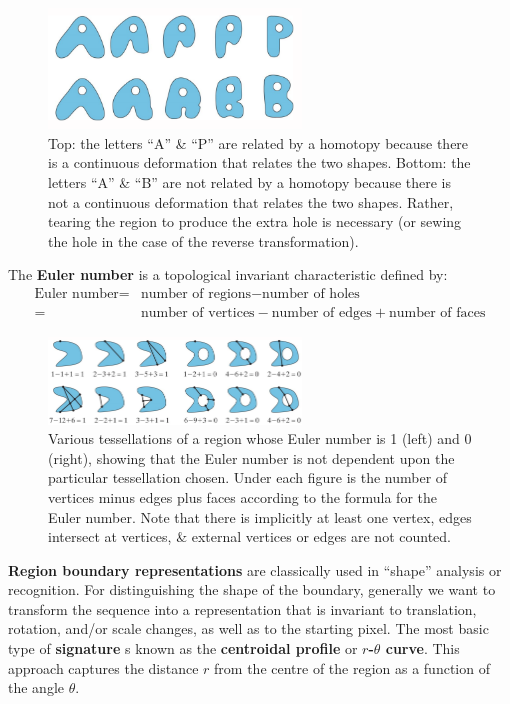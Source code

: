 \documentclass[a4paper,11pt]{article}
\begin{document}
\begin{figure}[H]
    \centering
    \includegraphics[width=0.6\textwidth]{images/homotopy.png}
    \caption{
        Top: the letters ``A'' \& ``P'' are related by a homotopy because there is a continuous deformation that relates the two shapes.
        Bottom: the letters ``A'' \& ``B'' are not related by a homotopy because there is not a continuous deformation that relates the two shapes.
        Rather, tearing the region to produce the extra hole is necessary (or sewing the hole in the case of the reverse transformation).
    }
\end{figure}

The \textbf{Euler number} is a topological invariant characteristic defined by:
\begin{align*}
    \text{Euler number} =& \text{number of regions} - \text{number of holes} \\
                        =& \text{number of vertices} - \text{number of edges} + \text{number of faces}
\end{align*}

\begin{figure}[H]
    \centering
    \includegraphics[width=0.6\textwidth]{images/eulertesselations.png}
    \caption{
        Various tessellations of a region whose Euler number is 1 (left) and 0 (right), showing that the Euler number is not dependent upon the particular tessellation chosen.
        Under each figure is the number of vertices minus edges plus faces according to the formula for the Euler number.
        Note that there is implicitly at least one vertex, edges intersect at vertices, \& external vertices or edges are not counted.
    }
\end{figure}

\textbf{Region boundary representations} are classically used in ``shape'' analysis or recognition.
For distinguishing the shape of the boundary, generally we want to transform the sequence into a representation that is invariant to translation, rotation, and/or scale changes, as well as to the starting pixel.
The most basic type of \textbf{signature} s known as the \textbf{centroidal profile} or \textbf{$r$-$\theta$ curve}.
This approach captures the distance $r$ from the centre of the region as a function of the angle $\theta$.
\end{document}
